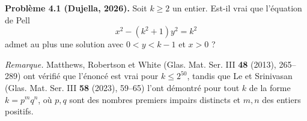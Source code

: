 \textbf{Problème 4.1 (Dujella, 2026).} Soit $k \geqslant 2$ un entier. Est-il vrai que l'équation de Pell
\[
x^2 - (k^2+1)y^2 = k^2
\]
admet au plus une solution avec $0<y<k-1$ et $x>0$ ?

\medskip

\textit{Remarque.} Matthews, Robertson et White (Glas. Mat. Ser. III \textbf{48} (2013), 265--289) ont vérifié que l'énoncé est vrai pour $k \leqslant 2^{50}$, tandis que Le et Srinivasan (Glas. Mat. Ser. III \textbf{58} (2023), 59--65) l'ont démontré pour tout $k$ de la forme $k=p^mq^n$, où $p,q$ sont des nombres premiers impairs distincts et $m,n$ des entiers positifs.
